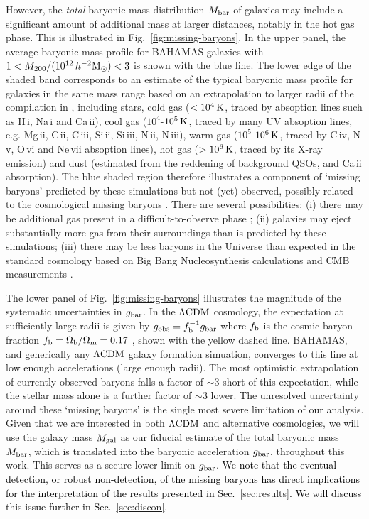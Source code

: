 \documentclass[usenatbib]{mnras}
\newcommand{\hmsun}{\,h^{-2} {\rm M_\odot}}
\newcommand{\lcdm}{{\rm \Lambda CDM}}
\newcommand{\un}[1]{_{\rm #1}}
\begin{document}
However, the \emph{total} baryonic mass distribution $M\un{bar}$ of galaxies may include a significant amount of additional mass at larger distances, notably in the hot gas phase. This is illustrated in Fig.~\ref{fig:missing-baryons}. In the upper panel, the average baryonic mass profile for BAHAMAS galaxies with $1<M_{200}/(10^{12}\hmsun)<3$ is shown with the blue line. The lower edge of the shaded band corresponds to an estimate of the typical baryonic mass profile for galaxies in the same mass range based on an extrapolation to larger radii of the compilation in \citet{tumlinson2017}, including stars, cold gas ($<10^4\,{\rm K}$, traced by absoption lines such as H\,{\sc i}, Na\,{\sc i} and Ca\,{\sc ii}), cool gas ($10^4$-$10^5\,{\rm K}$, traced by many UV absoption lines, e.g. Mg\,{\sc ii}, C\,{\sc ii}, C\,{\sc iii}, Si\,{\sc ii}, Si\,{\sc iii}, N\,{\sc ii}, N\,{\sc iii}), warm gas ($10^5$-$10^6\,{\rm K}$, traced by C\,{\sc iv}, N\,{\sc v}, O\,{\sc vi} and Ne\,{\sc vii} absoption lines), hot gas ($>10^6\,{\rm K}$, traced by its X-ray emission) and dust (estimated from the reddening of background QSOs, and Ca\,{\sc ii} absorption). The blue shaded region therefore illustrates a component of `missing baryons' predicted by these simulations but not (yet) observed, possibly related to the cosmological missing baryons \citep[e.g.][]{fukugita1998,fukugita2004,shull2012}. There are several possibilities: (i) there may be additional gas present in a difficult-to-observe phase \citep[e.g. hot, low-density gas, see for instance][]{nicastro2018}; (ii) galaxies may eject substantially more gas from their surroundings than is predicted by these simulations; (iii) there may be less baryons in the Universe than expected in the standard cosmology based on Big Bang Nucleosynthesis \cite[BBN,][]{kirkman2003} calculations and CMB measurements \cite[]{spergel2003,planck2014}.

The lower panel of Fig.~\ref{fig:missing-baryons} illustrates the magnitude of the systematic uncertainties in $g_{\rm bar}$. In the $\lcdm$ cosmology, the expectation at sufficiently large radii is given by $g\un{obs}=f^{-1}\un{b} g\un{bar}$ where $f\un b$ is the cosmic baryon fraction $f\un{b} = \Omega\un{b}/\Omega\un{m} = 0.17$ \cite[]{hinshaw2013}, shown with the yellow dashed line. BAHAMAS, and generically any $\lcdm$ galaxy formation simuation, converges to this line at low enough accelerations (large enough radii). The most optimistic extrapolation of currently observed baryons falls a factor of $\sim 3$ short of this expectation, while the stellar mass alone is a further factor of $\sim 3$ lower. The unresolved uncertainty around these `missing baryons' is the single most severe limitation of our analysis. Given that we are interested in both $\lcdm$ and alternative cosmologies, we will use the galaxy mass $M\un{gal}$ as our fiducial estimate of the total baryonic mass $M\un{bar}$, which is translated into the baryonic acceleration $g\un{bar}$, throughout this work. This serves as a secure lower limit on $g\un{bar}$. \textcolor{black}{We note that the eventual detection, or robust non-detection, of the missing baryons has direct implications for the interpretation of the results presented in Sec.~\ref{sec:results}. We will discuss this issue further in Sec.~\ref{sec:discon}}.
\end{document}
